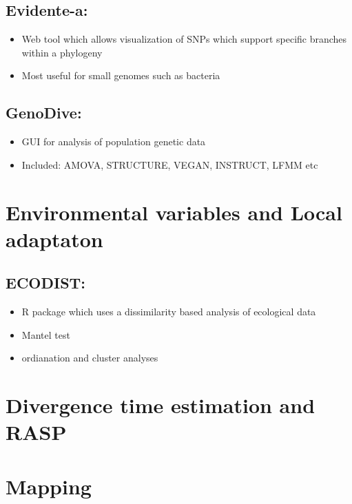 \documentclass[document.tex]{subfiles}
\begin{document}
    \subsection{Evidente-a: }
        \begin{itemize}
        \item Web tool which allows visualization of SNPs which support specific branches within a phylogeny
        \item Most useful for small genomes such as bacteria
        \end{itemize}
            
    \subsection{GenoDive: }
        \begin{itemize}
        \item GUI for analysis of population genetic data
        \item Included: AMOVA, STRUCTURE, VEGAN, INSTRUCT, LFMM etc
        \end{itemize} 

\section*{Environmental variables and Local adaptaton}

    \subsection{ECODIST: }
        \begin{itemize}
        \item R package which uses a dissimilarity based analysis of ecological data 
        \item Mantel test
        \item ordianation and cluster analyses
        \end{itemize} 


\section*{Divergence time estimation and RASP}


\section*{Mapping}



\bib{}
\end{document}
